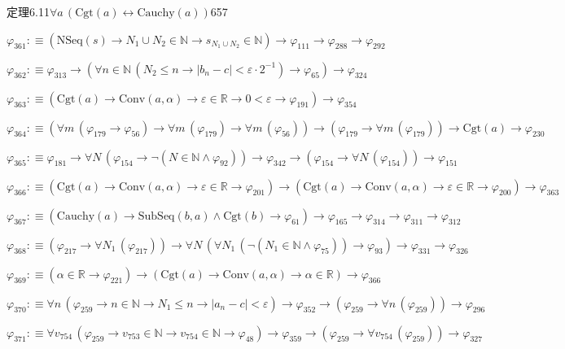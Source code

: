 \begin{fullproof}{定理6.11}{$\forall a\,(\mathrm{Cgt}(a) \leftrightarrow \mathrm{Cauchy}(a))$}{657}
\begin{abbrevlist}
\item $\varphi_{361} :\equiv (\mathrm{NSeq}(s) \to N_{1} \cup N_{2} \in \mathbb{N} \to s_{N_{1} \cup N_{2}} \in \mathbb{N}) \to \varphi_{111} \to \varphi_{288} \to \varphi_{292}$
\item $\varphi_{362} :\equiv \varphi_{313} \to (\forall n \in \mathbb{N}\,(N_{2} \leq n \to \lvert b_{n} - c \rvert < \varepsilon \cdot 2^{-1}) \to \varphi_{65}) \to \varphi_{324}$
\item $\varphi_{363} :\equiv (\mathrm{Cgt}(a) \to \mathrm{Conv}(a,\alpha) \to \varepsilon \in \mathbb{R} \to 0 < \varepsilon \to \varphi_{191}) \to \varphi_{354}$
\item $\varphi_{364} :\equiv (\forall m\,(\varphi_{179} \to \varphi_{56}) \to \forall m\,(\varphi_{179}) \to \forall m\,(\varphi_{56})) \to (\varphi_{179} \to \forall m\,(\varphi_{179})) \to \mathrm{Cgt}(a) \to \varphi_{230}$
\item $\varphi_{365} :\equiv \varphi_{181} \to \forall N\,(\varphi_{154} \to \neg (N \in \mathbb{N} \land \varphi_{92})) \to \varphi_{342} \to (\varphi_{154} \to \forall N\,(\varphi_{154})) \to \varphi_{151}$
\item $\varphi_{366} :\equiv (\mathrm{Cgt}(a) \to \mathrm{Conv}(a,\alpha) \to \varepsilon \in \mathbb{R} \to \varphi_{201}) \to (\mathrm{Cgt}(a) \to \mathrm{Conv}(a,\alpha) \to \varepsilon \in \mathbb{R} \to \varphi_{200}) \to \varphi_{363}$
\item $\varphi_{367} :\equiv (\mathrm{Cauchy}(a) \to \mathrm{SubSeq}(b,a) \land \mathrm{Cgt}(b) \to \varphi_{61}) \to \varphi_{165} \to \varphi_{314} \to \varphi_{311} \to \varphi_{312}$
\item $\varphi_{368} :\equiv (\varphi_{217} \to \forall N_{1}\,(\varphi_{217})) \to \forall N\,(\forall N_{1}\,(\neg (N_{1} \in \mathbb{N} \land \varphi_{75})) \to \varphi_{93}) \to \varphi_{331} \to \varphi_{326}$
\item $\varphi_{369} :\equiv (\alpha \in \mathbb{R} \to \varphi_{221}) \to (\mathrm{Cgt}(a) \to \mathrm{Conv}(a,\alpha) \to \alpha \in \mathbb{R}) \to \varphi_{366}$
\item $\varphi_{370} :\equiv \forall n\,(\varphi_{259} \to n \in \mathbb{N} \to N_{1} \leq n \to \lvert a_{n} - c \rvert < \varepsilon) \to \varphi_{352} \to (\varphi_{259} \to \forall n\,(\varphi_{259})) \to \varphi_{296}$
\item $\varphi_{371} :\equiv \forall v_{754}\,(\varphi_{259} \to v_{753} \in \mathbb{N} \to v_{754} \in \mathbb{N} \to \varphi_{48}) \to \varphi_{359} \to (\varphi_{259} \to \forall v_{754}\,(\varphi_{259})) \to \varphi_{327}$

\end{abbrevlist}
\end{fullproof}
